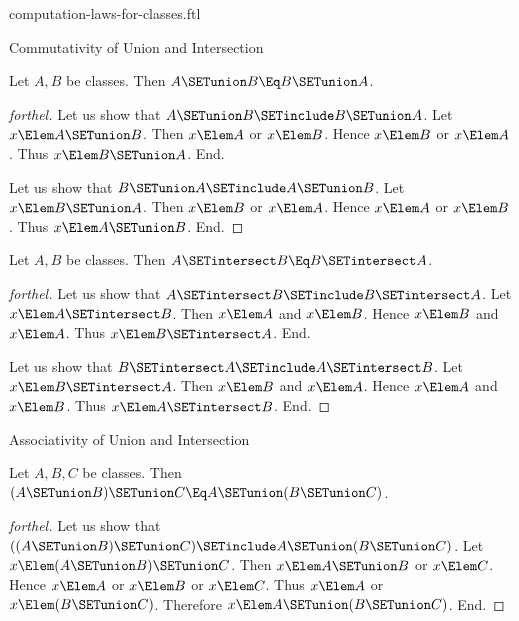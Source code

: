 \documentclass{stex}
\begin{document}
\begin{smodule}{computation-laws-for-classes.ftl}

\begin{sfragment}{Commutativity of Union and Intersection}
  \begin{proposition}[forthel,id=FOUNDATIONS_02_8446177632583680]
    Let $A, B$ be classes.
    Then $A \SETunion B \Eq B \SETunion A$.
  \end{proposition}
  \begin{proof}[forthel]
    Let us show that $A \SETunion B \SETinclude B \SETunion A$.
      Let $x \Elem A \SETunion B$.
      Then $x \Elem A$ or $x \Elem B$.
      Hence $x \Elem B$ or $x \Elem A$.
      Thus $x \Elem B \SETunion A$.
    End.

    Let us show that $B \SETunion A \SETinclude A \SETunion B$.
      Let $x \Elem B \SETunion A$.
      Then $x \Elem B$ or $x \Elem A$.
      Hence $x \Elem A$ or $x \Elem B$.
      Thus $x \Elem A \SETunion B$.
    End.
  \end{proof}

  \begin{proposition}[forthel,id=FOUNDATIONS_02_7565102251245568]
    Let $A, B$ be classes.
    Then $A \SETintersect B \Eq B \SETintersect A$.
  \end{proposition}
  \begin{proof}[forthel]
    Let us show that $A \SETintersect B \SETinclude B \SETintersect A$.
      Let $x \Elem A \SETintersect B$.
      Then $x \Elem A$ and $x \Elem B$.
      Hence $x \Elem B$ and $x \Elem A$.
      Thus $x \Elem B \SETintersect A$.
    End.

    Let us show that $B \SETintersect A \SETinclude A \SETintersect B$.
      Let $x \Elem B \SETintersect A$.
      Then $x \Elem B$ and $x \Elem A$.
      Hence $x \Elem A$ and $x \Elem B$.
      Thus $x \Elem A \SETintersect B$.
    End.
  \end{proof}
\end{sfragment}

\begin{sfragment}{Associativity of Union and Intersection}
  \begin{proposition}[forthel,id=FOUNDATIONS_02_3854032263184384]
    Let $A, B, C$ be classes.
    Then $(A \SETunion B) \SETunion C \Eq A \SETunion (B \SETunion C)$.
  \end{proposition}
  \begin{proof}[forthel]
    Let us show that $((A \SETunion B) \SETunion C) \SETinclude A \SETunion (B \SETunion C)$. %
      Let $x \Elem (A \SETunion B) \SETunion C$.
      Then $x \Elem A \SETunion B$ or $x \Elem C$.
      Hence $x \Elem A$ or $x \Elem B$ or $x \Elem C$.
      Thus $x \Elem A$ or $x \Elem (B \SETunion C)$.
      Therefore $x \Elem A \SETunion (B \SETunion C)$.
    End.


\end{proof}
\end{sfragment}
\end{smodule}
\end{document}
